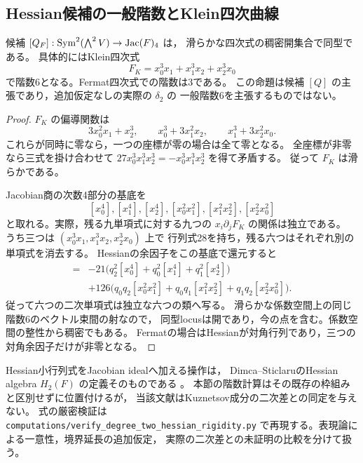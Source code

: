 \subsection{Hessian候補の一般階数とKlein四次曲線}

\begin{proposition}[Hessian候補の一般階数6]
\label{prop:ku-hessian-klein-rank}
候補 $[Q_F]:\operatorname{Sym}^2(\bigwedge^2V)\to\operatorname{Jac}(F)_4$ は，
滑らかな四次式の稠密開集合で同型である。
具体的にはKlein四次式
\[
 F_K=x_0^3x_1+x_1^3x_2+x_2^3x_0
\]
で階数6となる。Fermat四次式での階数は3である。
この命題は候補 $[Q]$ の主張であり，追加仮定なしの実際の $\delta_2$ の
一般階数6を主張するものではない。
\end{proposition}
\begin{proof}
$F_K$ の偏導関数は
\[
 3x_0^2x_1+x_2^3,\qquad
 x_0^3+3x_1^2x_2,\qquad
 x_1^3+3x_2^2x_0.
\]
これらが同時に零なら，一つの座標が零の場合は全て零となる。
全座標が非零なら三式を掛け合わせて
$27x_0^3x_1^3x_2^3=-x_0^3x_1^3x_2^3$ を得て矛盾する。
従って $F_K$ は滑らかである。

Jacobian商の次数4部分の基底を
\[
 [x_0^4],[x_1^4],[x_2^4],
 [x_0^2x_1^2],[x_1^2x_2^2],[x_2^2x_0^2]
\]
と取れる。実際，残る九単項式に対する九つの
$x_i\partial_jF_K$ の関係は独立である。
うち三つは $(x_0^3x_1,x_1^3x_2,x_2^3x_0)$ 上で
行列式28を持ち，残る六つはそれぞれ別の単項式を消去する。
Hessianの余因子をこの基底で還元すると
\begin{align*}
 [Q(F_K,P)]={}&-21\bigl(q_2^2[x_0^4]
                  +q_0^2[x_1^4]+q_1^2[x_2^4]\bigr)\\
 &+126\bigl(q_0q_2[x_0^2x_1^2]
           +q_0q_1[x_1^2x_2^2]+q_1q_2[x_2^2x_0^2]\bigr).
\end{align*}
従って六つの二次単項式は独立な六つの類へ写る。
滑らかな係数空間上の同じ階数6のベクトル束間の射なので，
同型locusは開であり，今の点を含む。係数空間の整性から稠密でもある。
Fermatの場合はHessianが対角行列であり，三つの対角余因子だけが非零となる。
\end{proof}

Hessian小行列式をJacobian idealへ加える操作は，
Dimca--SticlaruのHessian algebra $H_2(F)$ の定義そのものである
\cite[(1.2), Remark 3.3(iii)]{DimcaSticlaru2015}。
本節の階数計算はその既存の枠組みと区別せずに位置付けるが，
当該文献はKuznetsov成分の二次差との同定を与えない。
式の厳密検証は
\texttt{computations/verify\_degree\_two\_hessian\_rigidity.py}
で再現する。表現論による一意性，境界延長の追加仮定，
実際の二次差との未証明の比較を分けて扱う。
